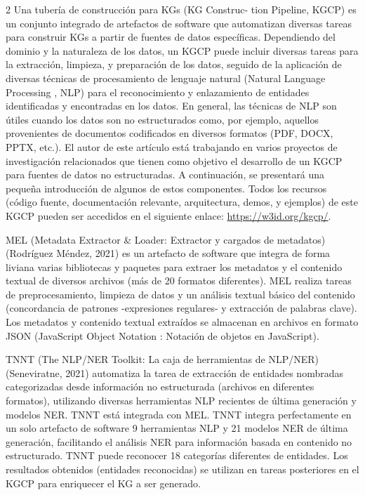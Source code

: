 \documentclass[12pt,spanish,Letterpaper,openany]{book}
\begin{document}
\begin {multicols}{2}
Una tubería de construcción para KGs (KG Construc-
tion Pipeline, KGCP) es un conjunto integrado de artefactos de software que automatizan diversas tareas para construir KGs a partir de fuentes de datos específicas. Dependiendo del dominio y la naturaleza de los datos, un KGCP puede incluir diversas tareas para la extracción, limpieza, y preparación de los datos, seguido de la aplicación de diversas técnicas de procesamiento de lenguaje natural (Natural Language Processing , NLP) para el reconocimiento y enlazamiento de entidades identificadas y encontradas en los datos. En general, las técnicas de NLP son útiles cuando los datos son no estructurados como, por ejemplo, aquellos provenientes de documentos codificados en diversos formatos (PDF, DOCX, PPTX, etc.). El autor de este artículo está trabajando en varios proyectos de investigación relacionados que tienen como objetivo el desarrollo de un KGCP para fuentes de datos no estructuradas. A continuación, se presentará una pequeña introducción de algunos de estos componentes. Todos los recursos (código fuente, documentación relevante, arquitectura, demos, y ejemplos) de este KGCP pueden ser accedidos en el siguiente enlace: \url{https://w3id.org/kgcp/}.

MEL (Metadata Extractor \& Loader: Extractor y cargados de metadatos) (Rodríguez Méndez, 2021) es un artefacto de software que integra de forma liviana varias bibliotecas y paquetes para extraer los metadatos y el contenido textual de diversos archivos (más de 20 formatos diferentes). MEL realiza tareas de preprocesamiento, limpieza de datos y un análisis textual básico del contenido (concordancia de patrones -expresiones regulares- y extracción de palabras clave). Los metadatos y contenido textual extraídos se almacenan en archivos en formato JSON (JavaScript Object Notation : Notación de objetos en JavaScript).

TNNT (The NLP/NER Toolkit: La caja de herramientas de NLP/NER) (Seneviratne, 2021) automatiza la tarea de extracción de entidades nombradas categorizadas desde información no estructurada (archivos en diferentes formatos), utilizando diversas herramientas NLP recientes de última generación y modelos NER. TNNT está integrada con MEL. TNNT integra perfectamente en un solo artefacto de software 9 herramientas NLP y 21 modelos NER de última generación, facilitando el análisis NER para información basada en contenido no estructurado. TNNT puede reconocer 18 categorías diferentes de entidades. Los resultados obtenidos (entidades reconocidas) se utilizan en tareas posteriores en el KGCP para enriquecer el KG a ser generado.


\end{multicols}
\end{document}
